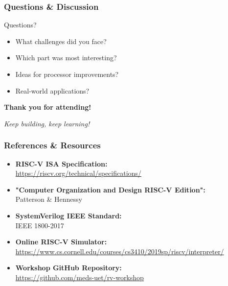 \documentclass[aspectratio=169,xcolor=dvipsnames]{beamer}
\begin{document}
\begin{frame}
\frametitle{Questions \& Discussion}
\begin{center}
\huge{Questions?}
\end{center}

\vspace{2em}
\begin{itemize}
    \item What challenges did you face?
    \item Which part was most interesting?
    \item Ideas for processor improvements?
    \item Real-world applications?
\end{itemize}

\vspace{2em}
\begin{center}
\textbf{Thank you for attending!}

\vspace{1em}
\textit{Keep building, keep learning!}
\end{center}
\end{frame}

\begin{frame}
\frametitle{References \& Resources}
\begin{itemize}
    \item \textbf{RISC-V ISA Specification:} \\
    \url{https://riscv.org/technical/specifications/}

    \item \textbf{"Computer Organization and Design RISC-V Edition":} \\
    Patterson \& Hennessy

    \item \textbf{SystemVerilog IEEE Standard:} \\
    IEEE 1800-2017

    \item \textbf{Online RISC-V Simulator:} \\
    \url{https://www.cs.cornell.edu/courses/cs3410/2019sp/riscv/interpreter/}

    \item \textbf{Workshop GitHub Repository:} \\
    \url{https://github.com/meds-uet/rv-workshop}
\end{itemize}
\end{frame}
\end{document}
